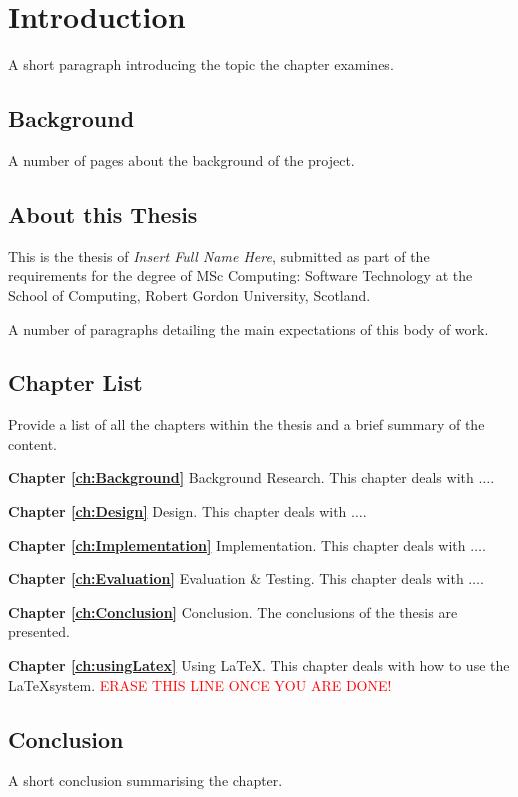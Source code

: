 \chapter{Introduction}
 \setcounter{page}{1}

A short paragraph introducing the topic the chapter examines.


\section{Background}

A number of pages about the background of the project.

\section{About this Thesis}
This is the thesis of \emph{Insert Full Name Here}, submitted as part of the requirements for the degree of MSc Computing: Software Technology at the School of Computing, Robert Gordon University, Scotland.

A number of paragraphs detailing the main expectations of this body of work.


\section{Chapter List}
Provide a list of all the chapters within the thesis and a brief summary of the content.

\textbf{Chapter \ref{ch:Background}} Background Research. This chapter
deals with $\ldots$.

\textbf{Chapter \ref{ch:Design}} Design. This chapter
deals with $\ldots$.

\textbf{Chapter \ref{ch:Implementation}} Implementation. This chapter
deals with $\ldots$.

\textbf{Chapter \ref{ch:Evaluation}} Evaluation \& Testing. This chapter
deals with $\ldots$.

\textbf{Chapter \ref{ch:Conclusion}} Conclusion. The conclusions of the thesis are presented.

\textbf{Chapter \ref{ch:usingLatex}} Using \LaTeX. This chapter
deals with how to use the \LaTeX \space system. \textcolor{red}{ERASE THIS LINE ONCE YOU ARE DONE!}


\section{Conclusion}
A short conclusion summarising the chapter.